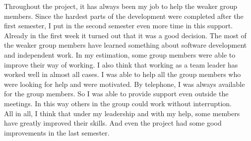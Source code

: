 Throughout the project, it has always been my job to help the weaker group members. Since the hardest parts of the development were completed after the first semester, I put in the second semester even more time in this support. Already in the first week it turned out that it was a good decision. The most of the weaker group members have learned something about software development and independent work. In my estimation, some group members were able to improve their way of working. I also think that working as a team leader has worked well in almost all cases. I was able to help all the group members who were looking for help and were motivated. By telephone, I was always available for the group members. So I was able to provide support even outside the meetings. In this way others in the group could work without interruption.\\
All in all, I think that under my leadership and with my help, some members have greatly improved their skills. And even the project had some good improvements in the last semester.